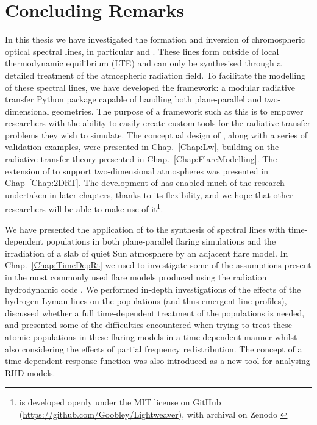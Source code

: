 \chapter{Concluding Remarks}\label{Chap:Conclusions}

In this thesis we have investigated the formation and inversion of chromospheric optical spectral lines, in particular \Ha{} and \CaLine{}.
These lines form outside of local thermodynamic equilibrium (LTE) and can only be synthesised through a detailed treatment of the atmospheric radiation field.
To facilitate the modelling of these spectral lines, we have developed the \Lw{} framework: a modular radiative transfer Python package capable of handling both plane-parallel and two-dimensional geometries.
The purpose of a framework such as this is to empower researchers with the ability to easily create custom tools for the radiative transfer problems they wish to simulate.
The conceptual design of \Lw{}, along with a series of validation examples, were presented in Chap.~\ref{Chap:Lw}, building on the radiative transfer theory presented in Chap.~\ref{Chap:FlareModelling}.
The extension of \Lw{} to support two-dimensional atmospheres was presented in Chap~\ref{Chap:2DRT}.
The development of \Lw{} has enabled much of the research undertaken in later chapters, thanks to its flexibility, and we hope that other researchers will be able to make use of it\footnote{\Lw{} \citep{Osborne2021} is developed openly under the MIT license on GitHub (\url{https://github.com/Goobley/Lightweaver}), with archival on Zenodo \citep{LightweaverZenodo}}.

We have presented the application of \Lw{} to the synthesis of spectral lines with time-dependent populations in both plane-parallel flaring simulations and the irradiation of a slab of quiet Sun atmosphere by an adjacent flare model.
In Chap.~\ref{Chap:TimeDepRt} we used \Lw{} to investigate some of the assumptions present in the most commonly used flare models produced using the \Sota{} radiation hydrodynamic code \Radyn{}.
We performed in-depth investigations of the effects of the hydrogen Lyman lines on the \Caii{} populations (and thus emergent line profiles), discussed whether a full time-dependent treatment of the \Caii{} populations is needed, and presented some of the difficulties encountered when trying to treat these atomic populations in these flaring models in a time-dependent manner whilst also considering the effects of partial frequency redistribution.
The concept of a time-dependent response function was also introduced as a new tool for analysing RHD models.

